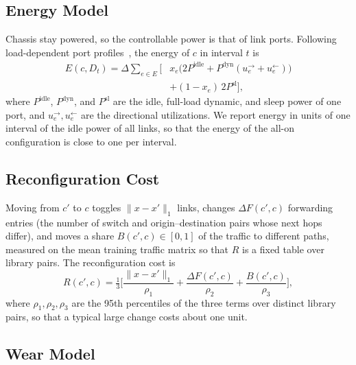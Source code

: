 \documentclass[preprint,12pt]{elsarticle}
\begin{document}
\subsection{Energy Model}

Chassis stay powered, so the controllable power is that of link ports. Following load-dependent port profiles~\cite{restrepo2009energy,mahadevan2009power,vishwanath2014modeling}, the energy of $c$ in interval $t$ is
\begin{equation}\label{eq:energy}
\begin{split}E(c,D_t)=\Delta\sum_{e\in E}\Big[&x_e\big(2P^{\mathrm{idle}}+P^{\mathrm{dyn}}(u_e^{\rightarrow}+u_e^{\leftarrow})\big)\\
&+(1-x_e)\,2P^{\mathrm{sl}}\Big],\end{split}
\end{equation}
where $P^{\mathrm{idle}}$, $P^{\mathrm{dyn}}$, and $P^{\mathrm{sl}}$ are the idle, full-load dynamic, and sleep power of one port, and $u_e^{\rightarrow},u_e^{\leftarrow}$ are the directional utilizations. We report energy in units of one interval of the idle power of all links, so that the energy of the all-on configuration is close to one per interval.

\subsection{Reconfiguration Cost}

Moving from $c'$ to $c$ toggles $\|x-x'\|_1$ links, changes $\Delta F(c',c)$ forwarding entries (the number of switch and origin--destination pairs whose next hops differ), and moves a share $B(c',c)\in[0,1]$ of the traffic to different paths, measured on the mean training traffic matrix so that $R$ is a fixed table over library pairs. The reconfiguration cost is
\begin{equation}\label{eq:reconf}
R(c',c)=\tfrac13\Big[\frac{\|x-x'\|_1}{\rho_1}+\frac{\Delta F(c',c)}{\rho_2}+\frac{B(c',c)}{\rho_3}\Big],
\end{equation}
where $\rho_1,\rho_2,\rho_3$ are the 95th percentiles of the three terms over distinct library pairs, so that a typical large change costs about one unit.

\subsection{Wear Model}
\end{document}
